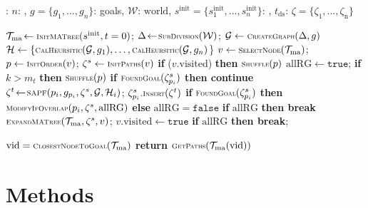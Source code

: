 \documentclass[letterpaper, 10 pt, conference]{ieeeconf}  %
\newcommand{\Acronym}[1]{\ensuremath{{{\texttt{#1}}}}}
\newcommand{\Symbol}[1]{\ensuremath{\mathcal{#1}}}
\newcommand{\Function}[1]{\ensuremath{{\scriptstyle{{\textsc{#1}}}}}}
\newcommand{\Var}[1]{\ensuremath{{{\mathrm{#1}}}}}
\newcommand{\False}{\ensuremath{\Acronym{false}}}
\newcommand{\True}{\ensuremath{\Acronym{true}}}
\newcommand{\Subdiv}{\ensuremath{\Delta}}
\newcommand{\World}{\Symbol{W}}
\newcommand{\Traj}{\ensuremath{\zeta}}
\newcommand{\Tree}{\Symbol{T}}
\begin{document}
\begin{algorithm}[ht]
\caption{\Function{MA-DL} module}
\label{alg:MADIST}
\footnotesize
\begin{algorithmic}
\STATE {}: $n$: , $g=\{g_1,...,g_n\}$: goals, $\World$: \Var{world}, $s^\Var{init}=\{s_1^\Var{init},...,s_n^\Var{init}\}$: , $t_\Var{ds}$: 
\STATE {} $\Traj=\{\Traj_1,...,\Traj_\Var{n}\}$
\end{algorithmic}
\begin{algorithmic}[1]
\STATE $\Tree_\Var{ma}\!\gets \Function{InitMATree}(s^\Var{init}, t=0)$;
$\Subdiv \! \gets\!\Function{SubDivision}(\World)$; $\mathcal{G} \gets \Function{CreateGraph}(\Subdiv, g)$\;
\STATE $\mathcal{H} \gets \{\Function{CalHeursitic}(\mathcal{G}, g_1),\ldots, \Function{CalHeursitic}(\mathcal{G}, g_n)$\}\;
\WHILE{$ \Function{time}() < t_\Var{ds}$}
    \STATE $v \gets \Function{SelectNode}(\Tree_\Var{ma})$; $p \gets \Function{InitOrder}(v)$; $\Traj^s \gets \Function{InitPaths}(v)$\;
    \STATE \textbf{if} ($v.\Var{visited}$) \textbf{then} $\Function{Shuffle}(p)$\;
        \STATE $\Var{allRG} \gets \True$; \textbf{if} $k>m_t$ \textbf{then} $\Function{Shuffle}(p)$\;
            \STATE \textbf{if } $\Function{FoundGoal}(\Traj^s_{p_i})$ \textbf{then continue}\;
            \STATE $\Traj^t\!\gets\!\Function{SAPF}(p_i, g_{p_i}, \Traj^s, \mathcal{G}, \mathcal{H}_i)$; $\Traj^s_{p_i}.\Function{Insert}(\Traj^t)$\; 
            \STATE \textbf{if} $\Function{FoundGoal}(\Traj^s_{p_i})$ \textbf{then} $\Function{ModifyIfOverlap}(p_i, \Traj^s, \Var{allRG})$\;
            \STATE \textbf{else} $\Var{allRG}=\False$\; 
        \ENDFOR
        \STATE \textbf{if} $\Var{allRG}$ \textbf{then break}\;
    \ENDFOR
    \STATE $\Function{ExpandMATree}(\Tree_\Var{ma}, \Traj^s, v)$; $v.\Var{visited} \gets \True$\;
    \STATE \textbf{if} $\Var{allRG}$ \textbf{then break};
\ENDWHILE

\STATE $\Var{vid} = \Function{ClosestNodeToGoal}(\Tree_\Var{ma})$\;
\STATE \textbf{return} $\Function{GetPaths}(\Tree_\Var{ma}(\Var{vid}))$\;
\end{algorithmic}
\end{algorithm}


\section{Methods} \label{sec:methods}
\end{document}
